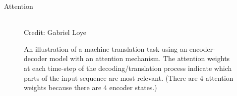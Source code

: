 \begin{vbframe}{Attention}
\framebreak
  
  \lz
  \lz
  \begin{figure}
    \centering
    \tiny{\\Credit: Gabriel Loye}
    \caption{\footnotesize An illustration of a machine translation task using an encoder-decoder model with an attention mechanism. The attention weights at each time-step of the decoding/translation process indicate which parts of the input sequence are most relevant. (There are 4 attention weights because there are 4 encoder states.)}
  \end{figure}
  
  
\end{vbframe}



